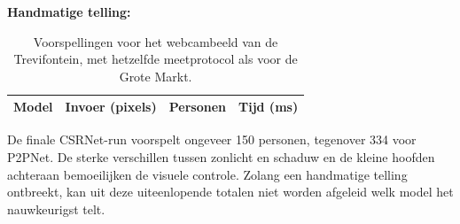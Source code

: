\noindent\textbf{Handmatige telling:} 

\begin{table}[H]
    \centering
    \small
    \begin{tabular}{lrrr}
        \toprule
        \textbf{Model} & \textbf{Invoer (pixels)} & \textbf{Personen} & \textbf{Tijd (ms)} \\
        \midrule
        
    \end{tabular}
    \caption[Modelvoorspellingen voor de Trevifontein]{Voorspellingen voor het webcambeeld van de Trevifontein, met hetzelfde meetprotocol als voor de Grote Markt.}
    \label{tab:trevi-modellen}
\end{table}

De finale CSRNet-run voorspelt ongeveer 150 personen, tegenover 334 voor P2PNet. De sterke verschillen tussen zonlicht en schaduw en de kleine hoofden achteraan bemoeilijken de visuele controle. Zolang een handmatige telling ontbreekt, kan uit deze uiteenlopende totalen niet worden afgeleid welk model het nauwkeurigst telt.
\clearpage
